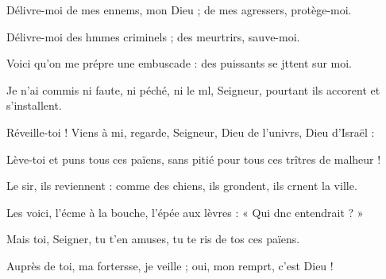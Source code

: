 \item Délivre-moi de mes ennems, mon Dieu ;\psstar{} de mes agressers, protège-moi.
\item Délivre-moi des hmmes criminels ;\psstar{} des meurtrirs, sauve-moi.
\item Voici qu’on me prépre une embuscade :\psstar{} des puissants se jttent sur moi.
\item Je n’ai commis ni faute, ni péché, ni le ml, Seigneur,\psstar{} pourtant ils accorent et s’installent. 
\item Réveille-toi ! Viens à mi, regarde,\psstar{} Seigneur, Dieu de l’univrs, Dieu d’Israël : 
\item Lève-toi et puns tous ces païens,\psstar{} sans pitié pour tous ces trîtres de malheur !
\item Le sir, ils reviennent :\psstar{} comme des chiens, ils grondent, ils crnent la ville.
\item Les voici, l’écme à la bouche,\psstar{} l’épée aux lèvres :\psstar{} « Qui dnc entendrait ? »
\item Mais toi, Seigner, tu t’en amuses,\psstar{} tu te ris de tos ces païens.
\item Auprès de toi, ma fortersse, je veille ;\psstar{} oui, mon remprt, c’est Dieu !